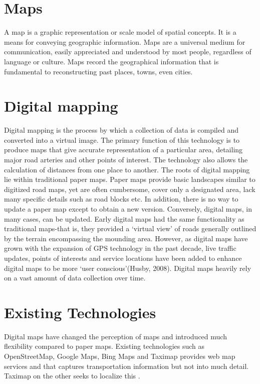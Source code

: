 \documentclass[oneside,12pt]{book}
\begin{document}
\section{Maps}
A map is a graphic representation or scale model of spatial concepts. It is a means for conveying geographic information. Maps are a universal medium for communication, easily appreciated and understood by most people, regardless of language or culture. Maps record the geographical information that is fundamental to reconstructing past places, towns, even cities.

\section{Digital mapping}
Digital mapping is the process by which a collection of data is compiled and converted into a virtual image. The primary function of this technology is to produce maps that give accurate representation of a particular area, detailing major road arteries and other points of interest. The technology also allows the calculation of distances from one place to another.
The roots of digital mapping lie within traditional paper maps. Paper maps provide basic landscapes similar to digitized road maps, yet are often cumbersome, cover only a designated area, lack many specific details such as road blocks etc. In addition, there is no way to update a paper map except to obtain a new version. Conversely, digital maps, in many cases, can be updated.
Early digital maps had the same functionality as traditional maps-that is, they provided a ‘virtual view’ of roads generally outlined by the terrain encompassing the mounding area. However, as digital maps have grown with the expansion of GPS technology in the past decade, live traffic updates, points of interests and service locations have been added to enhance digital maps to be more ‘user conscious’(Husby, 2008). Digital maps heavily rely on a vast amount of data collection over time.

\section{Existing Technologies}
Digital maps have changed the perception of maps and introduced much flexibility compared to paper maps. Existing technologies such as OpenStreetMap, Google Maps, Bing Maps and Taximap provides web map services and that captures transportation information but not into much detail. Taximap on the other seeks to localize this \citep{vinet2014arch}.
\end{document}
